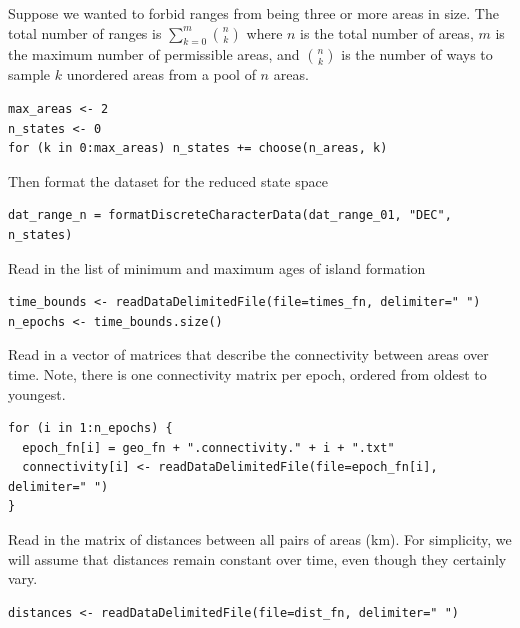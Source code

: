 Suppose we wanted to forbid ranges from being three or more areas in size.
The total number of ranges is $\sum_{k=0}^m {{n}\choose{k}}$ where $n$ is the total number of areas, $m$ is the maximum number of permissible areas, and ${{n}\choose{k}}$ is the number of ways to sample $k$ unordered areas from a pool of $n$ areas.

\begin{snugshade}
\begin{lstlisting}
max_areas <- 2
n_states <- 0
for (k in 0:max_areas) n_states += choose(n_areas, k)
\end{lstlisting}
\end{snugshade}

Then format the dataset for the reduced state space

\begin{snugshade}
\begin{lstlisting}
dat_range_n = formatDiscreteCharacterData(dat_range_01, "DEC", n_states)
\end{lstlisting}
\end{snugshade}



Read in the list of minimum and maximum ages of island formation

\begin{snugshade}
\begin{lstlisting}
time_bounds <- readDataDelimitedFile(file=times_fn, delimiter=" ")
n_epochs <- time_bounds.size()
\end{lstlisting}
\end{snugshade}

Read in a vector of matrices that describe the connectivity between areas over time.
Note, there is one connectivity matrix per epoch, ordered from oldest to youngest.

\begin{snugshade}
\begin{lstlisting}
for (i in 1:n_epochs) {
  epoch_fn[i] = geo_fn + ".connectivity." + i + ".txt"
  connectivity[i] <- readDataDelimitedFile(file=epoch_fn[i], delimiter=" ")
}
\end{lstlisting}
\end{snugshade}

Read in the matrix of distances between all pairs of areas (km). For simplicity, we will assume that distances remain constant over time, even though they certainly vary.

\begin{snugshade}
\begin{lstlisting}
distances <- readDataDelimitedFile(file=dist_fn, delimiter=" ")
\end{lstlisting}
\end{snugshade}


